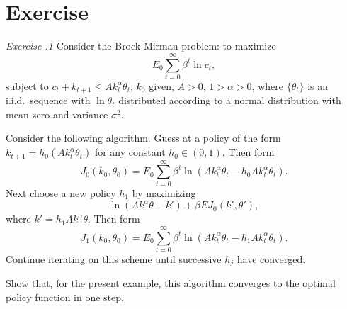 
\showchaptIDfalse
\showsectIDfalse
\section{Exercise}
\showchaptIDtrue
\showsectIDtrue
\medskip\noindent
{\it Exercise \the\chapternum.1}  
\medskip\noindent
Consider the Brock-Mirman problem: to maximize
$$E_0\sum_{t=0}^\infty \beta^t \ln c_t,$$
subject to $c_t+ k_{t+1} \leq Ak_t^\alpha\theta_t$, $k_0$ given,
 $A>0$, $1>\alpha>0$, where
$\{\theta_t\}$ is an i.i.d.\ sequence with $\ln\theta_t$
distributed according to a
normal distribution with mean zero and variance $\sigma^2$.

Consider the following algorithm.  Guess at a policy of the form
$k_{t+1}=h_0(Ak_t^\alpha \theta_t)$ for any constant $h_0\in(0,1)$.  Then form
$$J_0(k_0,\theta_0) =E_0\sum_{t=0}^\infty \beta^t \ln (Ak_t^\alpha \theta_t-h_0
 Ak_t^\alpha
\theta_t).$$
Next choose a new policy $h_1$ by maximizing
$$\ln (Ak^\alpha \theta-k') +\beta E J_0(k',\theta'),$$
where $k'=h_1Ak^\alpha\theta$.  Then form
$$J_1(k_0,\theta_0) =E_0\sum_{t=0}^\infty \beta^t \ln (Ak_t^\alpha \theta_t
-h_1Ak_t^\alpha
\theta_t).$$
Continue iterating on this scheme until successive $h_j$ have converged.

Show that, for the present example, this algorithm converges to the optimal
policy function in one step.

